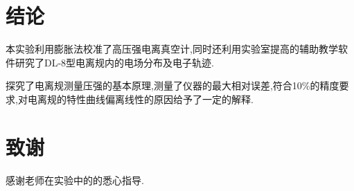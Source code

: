\documentclass[a4paper]{article}
\begin{document}
\section{结论}\label{conclusions}
本实验利用膨胀法校准了高压强电离真空计,同时还利用实验室提高的辅助教学软件研究了DL-8型电离规内的电场分布及电子轨迹.

探究了电离规测量压强的基本原理,测量了仪器的最大相对误差,符合10\%的精度要求,对电离规的特性曲线偏离线性的原因给予了一定的解释.

\section{致谢}\label{acknowledgments}
感谢老师在实验中的的悉心指导.
\end{document}
